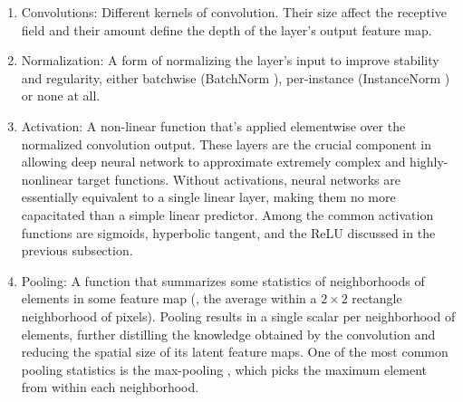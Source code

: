 \begin{enumerate}
    \item Convolutions: Different kernels of convolution. Their size affect the receptive field and their amount define the depth of the layer's output feature map.
    \item Normalization: A form of normalizing the layer's input to improve stability and regularity, either batchwise (\aka BatchNorm \cite{DBLP:journals/corr/IoffeS15}), per-instance (\aka InstanceNorm \cite{ulyanov2016instance}) or none at all.
    \item Activation: A non-linear function that's applied elementwise over the normalized convolution output. 
    These layers are the crucial component in allowing deep neural network to approximate extremely complex and highly-nonlinear target functions.
    Without activations, neural networks are essentially equivalent to a single linear layer, making them no more capacitated than a simple linear predictor.
    Among the common activation functions are sigmoids, hyperbolic tangent, and the ReLU discussed in the previous subsection.
    \item Pooling: A function that summarizes some statistics of neighborhoods of elements in some feature map (\eg, the average within a $2 \times 2$ rectangle neighborhood of pixels).
    Pooling results in a single scalar per neighborhood of elements, further distilling the knowledge obtained by the convolution and reducing the spatial size of its latent feature maps.
    One of the most common pooling statistics is the max-pooling \cite{Zhou1988ComputationOO}, which picks the maximum element from within each neighborhood.
\end{enumerate}

